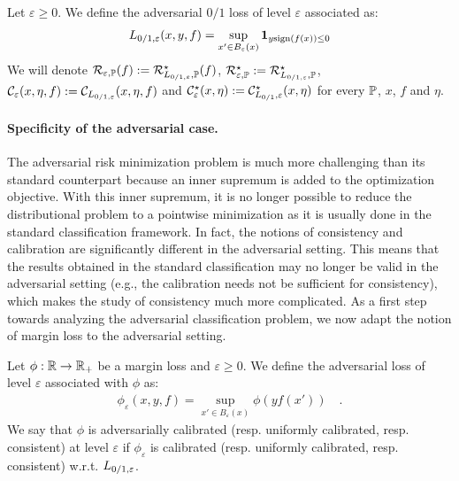 \begin{definition}
Let $\varepsilon\geq0$. We define the adversarial $0/1$ loss of level $\varepsilon$ associated as:
\begin{align*}
    L_{0/1,\varepsilon}(x,y,f) = \sup_{x'\in B_\varepsilon(x)} \mathbf{1}_{y\text{sign}(f(x))\leq 0}
\end{align*}
We will denote $\mathcal{R}_{\varepsilon,\mathbb{P}}(f) :=\mathcal{R}_{L_{0/1,\varepsilon},\mathbb{P}}^\star(f)$,  $\mathcal{R}_{\varepsilon,\mathbb{P}}^\star :=\mathcal{R}_{L_{0/1,\varepsilon},\mathbb{P}}^\star$, $\mathcal{C}_\varepsilon(x,\eta,f):= \mathcal{C}_{L_{0/1,\varepsilon}}(x,\eta,f)$ and $\mathcal{C}^\star_\varepsilon(x,\eta):= \mathcal{C}^\star_{L_{0/1},\varepsilon}(x,\eta)$ for every $\mathbb{P}$, $x$, $f$ and $\eta$. 
\end{definition}




\paragraph{Specificity of the adversarial case.}
The adversarial risk minimization problem is much more challenging than its standard counterpart because an inner supremum is added to the optimization objective. With this inner supremum, it is no longer possible to reduce the distributional problem to a pointwise minimization as it is usually done in the standard classification framework. In fact, the notions of consistency and calibration are significantly different in the adversarial setting. This means that the results obtained in the standard classification may no longer be valid in the adversarial setting (e.g., the calibration needs not be sufficient for consistency), which makes the study of consistency much more complicated. As a first step towards analyzing the adversarial classification problem, we now adapt the notion of margin loss to the adversarial setting.

\begin{definition}
Let $\phi:\mathbb{R}\to\mathbb{R}_+$ be a margin loss and $\varepsilon\geq0$. We define the adversarial loss of level $\varepsilon$ associated with $\phi$ as:
\begin{align*}
    \phi_\varepsilon(x,y,f) = \sup_{x'\in B_\varepsilon(x)} \phi(yf(x'))\quad.
\end{align*}
We say that $\phi$ is adversarially calibrated (resp. uniformly calibrated, resp. consistent) at level $\varepsilon$ if $\phi_\varepsilon$ is calibrated (resp. uniformly calibrated, resp. consistent) w.r.t. $L_{0/1,\varepsilon}$.
\end{definition}




